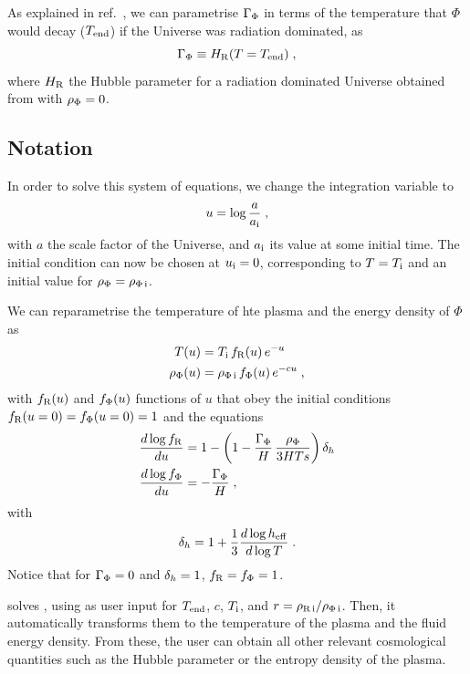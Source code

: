 \documentclass[11pt,a4paper]{article}
\begin{document}
As explained in ref.~\cite{Arias:2020qty}, we can parametrise $\Gamma_{\Phi}$ in terms of the temperature that $\Phi$ would decay ($T_{\rm end}{}$) if the Universe was radiation dominated, as
%
\begin{equation}
	\Gamma_{\Phi} \equiv H_{\rm R}(T=T_{\rm end}{})\;,
	\label{eq:Tend_def}
\end{equation}
%
where $H_{\rm R}$ the Hubble parameter for a radiation dominated Universe obtained from  with $\rho_{\Phi}=0$.


\subsection{Notation}\label{sec:notation}

In order to solve this system of equations, we change the integration variable to 
%
\begin{equation}
	u=\log\frac{a}{a_{\rm i}{}}\;,	
	\label{eq:u_def}
\end{equation}
%
with $a$ the scale factor of the Universe, and $a_{\rm i}{}$ its value at some initial time. The initial condition can now be chosen at $u_{\rm i}{}=0$, corresponding to $T=T_{\rm i}{}$ and an initial value for $\rho_{\Phi}=\rho_{\Phi\,{\rm i}}$. 

We can reparametrise the temperature of hte plasma and the energy density of $\Phi$ as 
%
\begin{align}
	T(u) &= T_{\rm i}{}  \, f_{\rm R}(u) \, e^{-u}  \label{eq:fR_def} \\ 
	\rho_{\Phi}(u) &= \rho_{\Phi\,{\rm i}} \, f_{\Phi}(u) \label{eq:fPhi_def} \, e^{-cu}\;,
\end{align}
%
with $f_{\rm R}(u)$ and $f_{\Phi}(u)$ functions of $u$ that obey the initial conditions $f_{\rm R}(u=0)=f_{\Phi}(u=0)=1$ and the equations
%
\begin{align}
	\dfrac{d\log f_{\rm R} }{du} &=  1- \left( 1- \dfrac{\Gamma_{\Phi}}{H} \, \dfrac{\rho_{\Phi}}{3HTs}   \right) \delta_h{}  \label{eq:dlogfRdu} \\ 
	\dfrac{d\log f_{\Phi}}{du} &= -\dfrac{\Gamma_{\Phi}}{H} \label{eq:dlogfPhidu} \;,
\end{align}
%
with 
\begin{equation}
	\delta_h{} = 1+ \dfrac{1}{3} \dfrac{d\log h_{\rm eff}{}}{d\log T}\;.
	\label{eq:dh_def}
\end{equation}
%
Notice that for $\Gamma_{\Phi}=0$ and $\delta_h{}=1$, $f_{\rm R}=f_{\Phi}=1$. 


\nsc solves , using as user input for $T_{\rm end}{}$, $c$, $T_{\rm i}{}$, and $r=\rho_{\rm R\,i}/\rho_{\Phi\,{\rm i}}$. Then, it automatically transforms them to the temperature of the plasma and the fluid energy density. From these, the user can obtain all other relevant cosmological quantities such as the Hubble parameter or the entropy density of the plasma.
\end{document}
